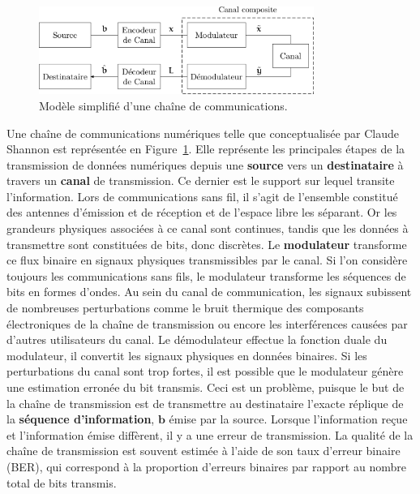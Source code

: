 \begin{figure}[t]
\centering
\includegraphics[width=0.8\textwidth]{main/ch1_fig/chaine_com}
\caption{Modèle simplifié d'une chaîne de communications.}
\label{fig:chaine_com}
\end{figure}
Une chaîne de communications numériques telle que conceptualisée par Claude Shannon \cite{shannon_mathematical_2001} est représentée en Figure~\ref{fig:chaine_com}.
Elle représente les principales étapes de la transmission de données numériques depuis une \textbf{source} vers un \textbf{destinataire} à travers un \textbf{canal} de transmission.
Ce dernier est le support sur lequel transite l'information. Lors de communications sans fil, il s'agit de l'ensemble constitué des antennes d'émission et de réception et de l'espace libre les séparant. Or les grandeurs physiques associées à ce canal sont continues, tandis que les données à transmettre sont constituées de bits, donc discrètes. Le \textbf{modulateur} transforme ce flux binaire en signaux physiques transmissibles par le canal. Si l'on considère toujours les communications sans fils, le modulateur transforme les séquences de bits en formes d'ondes. Au sein du canal de communication, les signaux subissent de nombreuses perturbations comme le bruit thermique des composants électroniques de la chaîne de transmission ou encore les interférences causées par d'autres utilisateurs du canal. Le démodulateur effectue la fonction duale du modulateur, il convertit les signaux physiques en données binaires. Si les perturbations du canal sont trop fortes, il est possible que le modulateur génère une estimation erronée du bit transmis. Ceci est un problème, puisque le but de la chaîne de transmission est de transmettre au destinataire l'exacte réplique de la \textbf{séquence d'information}, $\mathbold{b}$ émise par la source. Lorsque l'information reçue et l'information émise diffèrent, il y a une erreur de transmission. La qualité de la chaîne de transmission est souvent estimée à l'aide de son taux d'erreur binaire (BER), qui correspond à la proportion d'erreurs binaires par rapport au nombre total de bits transmis.

